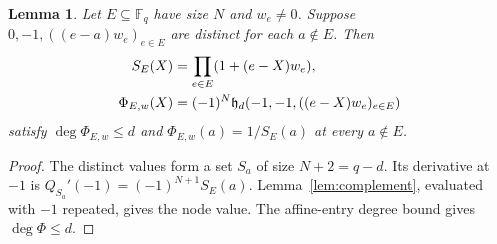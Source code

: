 \documentclass[12pt,letterpaper,onecolumn]{article}
\newtheorem{lemma}[theorem]{Lemma}
\theoremstyle{definition}
\newcommand{\F}{\mathbb F}
\newcommand{\HH}{\mathfrak h}
\begin{document}
\begin{lemma}\label{lem:boundary}
Let $E\subseteq\F_q$ have size $N$ and $w_e\ne0$. Suppose $0,-1,((e-a)w_e)_{e\in E}$ are distinct for each $a\notin E$. Then
\begin{align}
 S_E(X)&=\prod_{e\in E}(1+(e-X)w_e),\notag\\
 \Phi_{E,w}(X)&=(-1)^N\HH_d(-1,-1,((e-X)w_e)_{e\in E})
 \label{eq:phi}
\end{align}
satisfy $\deg\Phi_{E,w}\le d$ and $\Phi_{E,w}(a)=1/S_E(a)$ at every $a\notin E$.
\end{lemma}
\begin{proof}
The distinct values form a set $S_a$ of size $N+2=q-d$. Its derivative at $-1$ is $Q_{S_a}'(-1)=(-1)^{N+1}S_E(a)$. Lemma~\ref{lem:complement}, evaluated with $-1$ repeated, gives the node value. The affine-entry degree bound gives $\deg\Phi\le d$.
\end{proof}
\end{document}
